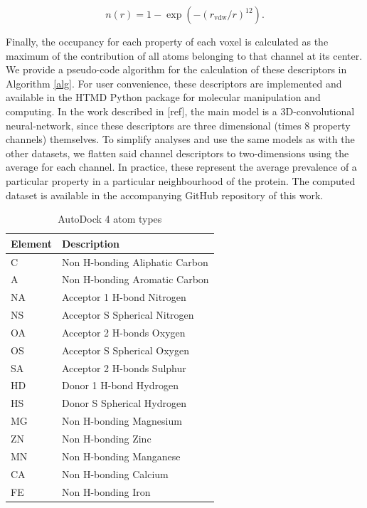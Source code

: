 \documentclass[10pt,a4paper,twoside]{book}
\begin{document}
\begin{equation}
    n(r) = 1-\exp\left(-(r_{\mathrm{vdw}}/r)^{12}\right).
\end{equation}

 Finally, the occupancy for each property of each voxel is calculated as the maximum of the contribution of all atoms belonging to that channel at its center. We provide a pseudo-code algorithm for the calculation of these descriptors in Algorithm \ref{alg}. For user convenience, these descriptors are implemented and available in the HTMD \cite{Doerr2016} Python package for molecular manipulation and computing. In the work described in [ref], the main model is a 3D-convolutional neural-network, since these descriptors are three dimensional (times 8 property channels) themselves. To simplify analyses and use the same models as with the other datasets, we flatten said channel descriptors to two-dimensions using the average for each channel. In practice, these represent the average prevalence of a particular property in a particular neighbourhood of the protein. The computed dataset is available in the accompanying GitHub repository of this work.
 
 \begin{table}
\centering
\caption{AutoDock 4 atom types}
\label{table:autodockprop}
\begin{tabular}{@{}ll@{}}
\toprule
\textbf{Element} & \textbf{Description} \\ \midrule
C  & Non H-bonding Aliphatic Carbon     \\
A  & Non H-bonding Aromatic Carbon      \\
NA & Acceptor 1 H-bond Nitrogen         \\
NS & Acceptor S Spherical Nitrogen      \\
OA & Acceptor 2 H-bonds Oxygen          \\
OS & Acceptor S Spherical Oxygen        \\
SA & Acceptor 2 H-bonds Sulphur         \\
HD & Donor 1 H-bond Hydrogen            \\
HS & Donor S Spherical Hydrogen         \\
MG & Non H-bonding Magnesium            \\
ZN & Non H-bonding Zinc                 \\
MN & Non H-bonding Manganese            \\
CA & Non H-bonding Calcium              \\
FE & Non H-bonding Iron                 \\ \bottomrule
\end{tabular}
\end{table}
\end{document}
